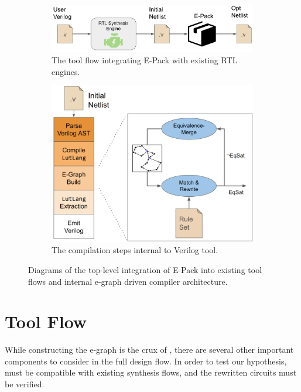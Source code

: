 \begin{figure}
    \begin{subfigure}{0.47\textwidth}
        \centering
        \includegraphics[width=\textwidth]{img/flow.png}
        \caption{The tool flow integrating E-Pack with existing RTL engines.}\label{fig:flow:rtl}
    \end{subfigure}
    \hfill\vspace{4mm}
    \begin{subfigure}{0.47\textwidth}
        \centering
        \includegraphics[width=\textwidth]{img/egraph.png}
        \caption{The compilation steps internal to \shortname{} Verilog tool.}\label{fig:flow:egraph}
    \end{subfigure}
    \caption{Diagrams of the top-level integration of E-Pack into existing tool flows and internal e-graph driven compiler architecture.}\label{fig:flow}
\end{figure}

\section{Tool Flow}\label{sec:flow}

While constructing the e-graph is the crux of \shortname{}, there are several
other important components to consider in the full design flow. In order to
test our hypothesis, \shortname{} must be compatible with existing synthesis
flows, and the rewritten circuits must be verified.


